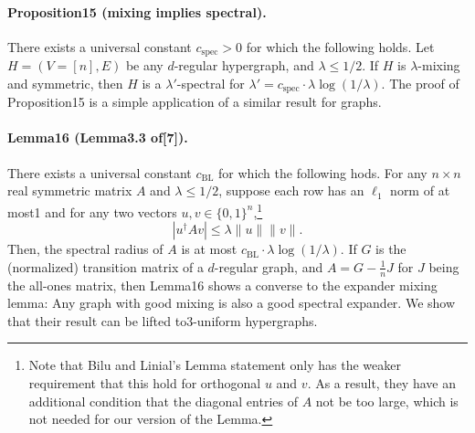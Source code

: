 \documentclass[10pt,a4paper]{article}
\begin{document}
\paragraph{Proposition15 (mixing implies spectral).} There exists a universal constant $c_{\mathrm{spec}}>0$ for which the following holds. Let $H=(V=[n],E)$ be any $d$-regular hypergraph, and $\lambda\leq1/2$. If $H$ is $\lambda$-mixing and symmetric, then $H$ is a $\lambda'$-spectral for $\lambda'=c_{\mathrm{spec}}\cdot\lambda\log(1/\lambda)$.
The proof of Proposition15 is a simple application of a similar result for graphs.
\paragraph{Lemma16 (Lemma3.3 of[7]).} There exists a universal constant $c_{\mathrm{BL}}$ for which the following hods. For any $n\times n$ real symmetric matrix $A$ and $\lambda\leq1/2$, suppose each row has an $\ell_1$ norm of at most1 and for any two vectors $u,v\in\{0,1\}^n$,\footnote{Note that Bilu and Linial's Lemma statement only has the weaker requirement that this hold for orthogonal $u$ and $v$. As a result, they have an additional condition that the diagonal entries of $A$ not be too large, which is not needed for our version of the Lemma.}
\[|u^{\dagger}Av|\leq\lambda\|u\|\|v\|.\tag{4}\]
Then, the spectral radius of $A$ is at most $c_{\mathrm{BL}}\cdot\lambda\log(1/\lambda)$.
If $G$ is the (normalized) transition matrix of a $d$-regular graph, and $A=G-\frac1nJ$ for $J$ being the all-ones matrix, then Lemma16 shows a converse to the expander mixing lemma: Any graph with good mixing is also a good spectral expander. We show that their result can be lifted to3-uniform hypergraphs.
\end{document}
